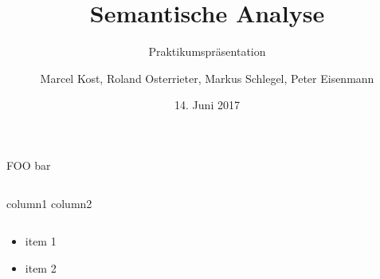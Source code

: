 \documentclass[18pt]{beamer}
\title[]{Semantische Analyse}
\subtitle{Praktikumspräsentation}
\author{Marcel Kost, Roland Osterrieter, Markus Schlegel, Peter Eisenmann}
\date{14. Juni 2017}
\institute{IPD Snelting, Lehrstuhl für Programmierparadigmen}
\begin{document}
\begin{frame}
\titlepage
\end{frame}
\newcommand{\code}{\texttt}

\begin{frame}{FOO \footnotesize bar} \center
	\begin{figure}[htp]
	\end{figure}
	\begin{columns}
		 column1
		 column2
	\end{columns}
	\begin{itemize}
		\item item 1
		\item item 2
	\end{itemize}\ \\
\end{frame}

\end{document}
